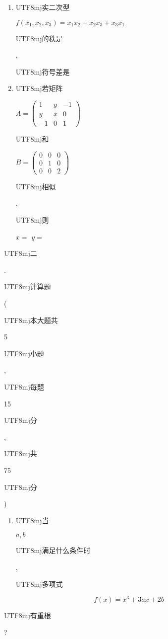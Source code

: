 \documentclass[10pt]{article}
\begin{document}
\begin{enumerate}
  \item \begin{CJK}{UTF8}{mj}实二次型\end{CJK} $f\left(x_{1}, x_{2}, x_{3}\right)=x_{1} x_{2}+x_{2} x_{3}+x_{3} x_{1}$ \begin{CJK}{UTF8}{mj}的秩是\end{CJK} , \begin{CJK}{UTF8}{mj}符号差是\end{CJK}

  \item \begin{CJK}{UTF8}{mj}若矩阵\end{CJK} $A=\left(\begin{array}{ccc}1 & y & -1 \\ y & x & 0 \\ -1 & 0 & 1\end{array}\right)$ \begin{CJK}{UTF8}{mj}和\end{CJK} $B=\left(\begin{array}{lll}0 & 0 & 0 \\ 0 & 1 & 0 \\ 0 & 0 & 2\end{array}\right)$ \begin{CJK}{UTF8}{mj}相似\end{CJK}, \begin{CJK}{UTF8}{mj}则\end{CJK} $x=$ $y=$

\end{enumerate}
\begin{CJK}{UTF8}{mj}二\end{CJK}. \begin{CJK}{UTF8}{mj}计算题\end{CJK} (\begin{CJK}{UTF8}{mj}本大题共\end{CJK} 5 \begin{CJK}{UTF8}{mj}小题\end{CJK}, \begin{CJK}{UTF8}{mj}每题\end{CJK} 15 \begin{CJK}{UTF8}{mj}分\end{CJK}, \begin{CJK}{UTF8}{mj}共\end{CJK} 75 \begin{CJK}{UTF8}{mj}分\end{CJK})

\begin{enumerate}
  \item \begin{CJK}{UTF8}{mj}当\end{CJK} $a, b$ \begin{CJK}{UTF8}{mj}满足什么条件时\end{CJK}, \begin{CJK}{UTF8}{mj}多项式\end{CJK}
\end{enumerate}
$$
f(x)=x^{3}+3 a x+2 b
$$
\begin{CJK}{UTF8}{mj}有重根\end{CJK}?
\end{document}

